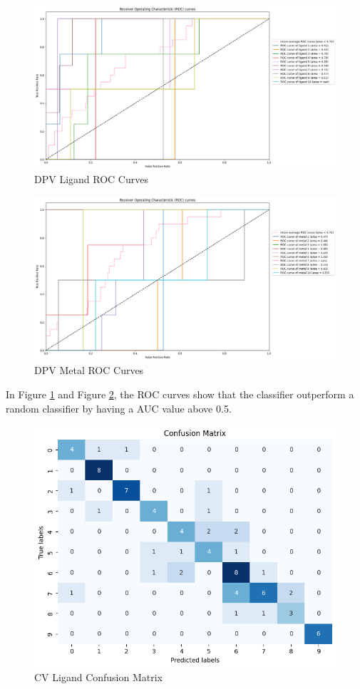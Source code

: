 \begin{figure}[h!]
  \centering
    \includegraphics[width=1.0\textwidth]{figures/dpv_ligand_roc.png}
    \caption{DPV Ligand ROC Curves}
    \label{dpv_ligand_roc}
\end{figure}
\begin{figure}[h!]
  \centering
    \includegraphics[width=1.0\textwidth]{figures/dpv_metal_roc.png}
    \caption{DPV Metal ROC Curves}
    \label{dpv_metal_roc}
\end{figure}
In Figure \ref{dpv_ligand_roc} and Figure \ref{dpv_metal_roc}, the ROC curves show that the classifier outperform a random classifier by having a AUC value above 0.5. 
\begin{figure}[h!]
  \centering
    \includegraphics[width=1.0\textwidth]{figures/cv_ligand_matrix.png}
    \caption{CV Ligand Confusion Matrix}
    \label{cv_ligand_matrix}
\end{figure}
